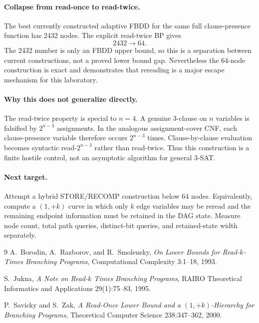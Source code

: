 \paragraph{Collapse from read-once to read-twice.}
The best currently constructed adaptive FBDD for the same full clause-presence function has
2432 nodes. The explicit read-twice BP gives
\[
2432\longrightarrow\boxed{64}.
\]
The 2432 number is only an FBDD upper bound, so this is a separation between current
constructions, not a proved lower bound gap. Nevertheless the 64-node construction is exact
and demonstrates that rereading is a major escape mechanism for this laboratory.

\paragraph{Why this does not generalize directly.}
The read-twice property is special to $n=4$. A genuine 3-clause on $n$ variables is falsified
by $2^{n-3}$ assignments. In the analogous assignment-cover CNF, each clause-presence variable
therefore occurs $2^{n-3}$ times. Clause-by-clause evaluation becomes syntactic
read-$2^{n-3}$ rather than read-twice. Thus this construction is a finite hostile control,
not an asymptotic algorithm for general 3-SAT.

\paragraph{Next target.}
Attempt a hybrid STORE/RECOMP construction below 64 nodes. Equivalently, compute a
$(1,+k)$ curve in which only $k$ edge variables may be reread and the remaining endpoint
information must be retained in the DAG state. Measure node count, total path queries,
distinct-bit queries, and retained-state width separately.

\begin{thebibliography}{9}
A.~Borodin, A.~Razborov, and R.~Smolensky,
\emph{On Lower Bounds for Read-$k$-Times Branching Programs},
Computational Complexity 3:1--18, 1993.

S.~Jukna,
\emph{A Note on Read-$k$ Times Branching Programs},
RAIRO Theoretical Informatics and Applications 29(1):75--83, 1995.

P.~Savicky and S.~Zak,
\emph{A Read-Once Lower Bound and a $(1,+k)$-Hierarchy for Branching Programs},
Theoretical Computer Science 238:347--362, 2000.
\end{thebibliography}

